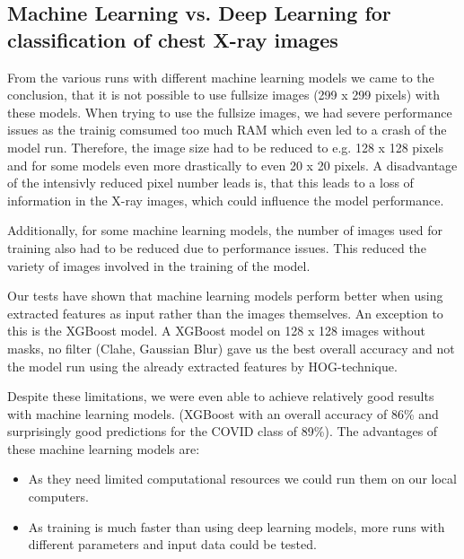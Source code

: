 \documentclass{article}
\begin{document}

\subsection{Machine Learning vs. Deep Learning for classification of chest X-ray images}

From the various runs with different machine learning models we came to the conclusion, that it is not possible to use fullsize images (299 x 299 pixels) with these models. 
When trying to use the fullsize images, we had severe performance issues as the trainig comsumed too much RAM which even led to a crash of the model run. Therefore, the image size had to be reduced to e.g. 128 x 128 pixels and for some models even more drastically to even 20 x 20 pixels. A disadvantage of the intensivly reduced pixel number leads is, that this leads to a loss of information in the X-ray images, which could influence the model performance. 

Additionally, for some machine learning models, the number of images used for training also had to be reduced due to performance issues. This reduced the variety of images involved in the training of the model. 

Our tests have shown that machine learning models perform better when using extracted features as input rather than the images themselves. An exception to this is the XGBoost model. A XGBoost model on 128 x 128 images without masks, no filter (Clahe, Gaussian Blur) gave us the best overall accuracy and not the model run using the already extracted features by HOG-technique. 

Despite these limitations, we were even able to achieve relatively good results with machine learning models. (XGBoost with an overall accuracy of 86\% and surprisingly good predictions for the COVID class of 89\%). 
The advantages of these machine learning models are: 
\begin{itemize}
    \item As they need limited computational resources we could run them on our local computers.
    \item As training is much faster than using deep learning models, more runs with different parameters and input data could be tested. 
\end{itemize}
\end{document}
